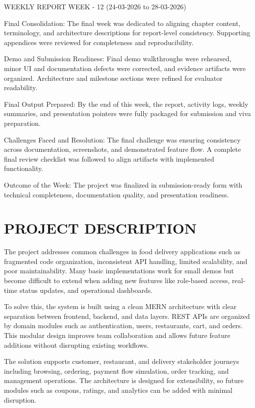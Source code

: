 \documentclass[12pt,a4paper]{report}
\begin{document}
WEEKLY REPORT
WEEK - 12 (24-03-2026 to 28-03-2026)

Final Consolidation:
The final week was dedicated to aligning chapter content, terminology, and architecture descriptions for report-level consistency. Supporting appendices were reviewed for completeness and reproducibility.

Demo and Submission Readiness:
Final demo walkthroughs were rehearsed, minor UI and documentation defects were corrected, and evidence artifacts were organized. Architecture and milestone sections were refined for evaluator readability.

Final Output Prepared:
By the end of this week, the report, activity logs, weekly summaries, and presentation pointers were fully packaged for submission and viva preparation.

Challenges Faced and Resolution:
The final challenge was ensuring consistency across documentation, screenshots, and demonstrated feature flow. A complete final review checklist was followed to align artifacts with implemented functionality.

Outcome of the Week:
The project was finalized in submission-ready form with technical completeness, documentation quality, and presentation readiness.

\chapter{PROJECT DESCRIPTION}
The project addresses common challenges in food delivery applications such as fragmented code organization, inconsistent API handling, limited scalability, and poor maintainability. Many basic implementations work for small demos but become difficult to extend when adding new features like role-based access, real-time status updates, and operational dashboards.

To solve this, the system is built using a clean MERN architecture with clear separation between frontend, backend, and data layers. REST APIs are organized by domain modules such as authentication, users, restaurants, cart, and orders. This modular design improves team collaboration and allows future feature additions without disrupting existing workflows.

The solution supports customer, restaurant, and delivery stakeholder journeys including browsing, ordering, payment flow simulation, order tracking, and management operations. The architecture is designed for extensibility, so future modules such as coupons, ratings, and analytics can be added with minimal disruption.
\end{document}
